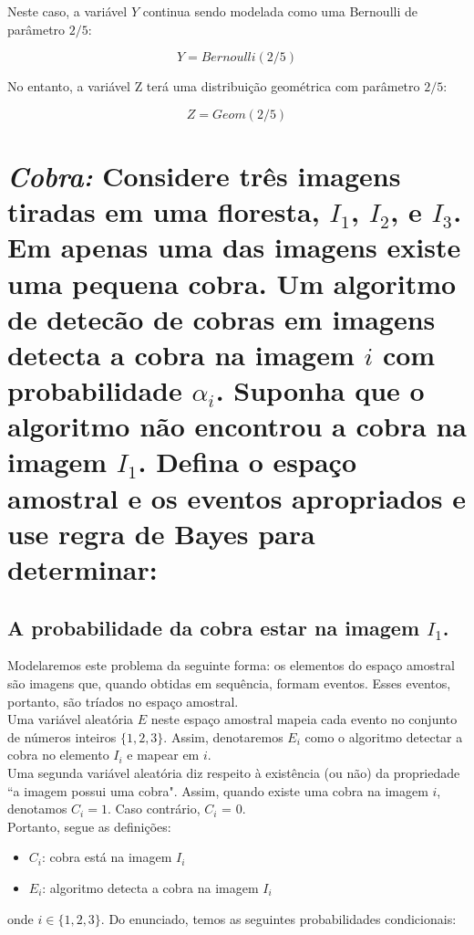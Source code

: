 \documentclass[a4paper]{article}
\begin{document}
Neste caso, a variável $Y$ continua sendo modelada como uma Bernoulli de parâmetro $2/5$:

$$Y = Bernoulli(2/5)$$

No entanto, a variável Z terá uma distribuição geométrica com parâmetro $2/5$:

$$Z = Geom(2/5)$$


\section{\textit{Cobra:} Considere três imagens tiradas em uma floresta, $I_1$, $I_2$, e $I_3$. Em apenas uma das imagens existe uma pequena cobra. Um algoritmo de detecão de cobras em imagens detecta a cobra na imagem $i$ com probabilidade $\alpha_i$. Suponha que o algoritmo não encontrou a cobra na imagem $I_1$. Defina o espaço amostral e os eventos apropriados e use regra de Bayes para determinar:}

\subsection{A probabilidade da cobra estar na imagem $I_1$.}

Modelaremos este problema da seguinte forma: os elementos do espaço amostral são imagens que, quando obtidas em sequência, formam eventos. Esses eventos, portanto, são tríados no espaço amostral. \\

Uma variável aleatória $E$ neste espaço amostral mapeia cada evento no conjunto de números inteiros $\{1, 2, 3\}$. Assim, denotaremos $E_i$ como o algoritmo detectar a cobra no elemento $I_i$ e mapear em $i$.\\

Uma segunda variável aleatória diz respeito à existência (ou não) da propriedade ``a imagem possui uma cobra".  Assim, quando existe uma cobra na imagem $i$, denotamos $C_i = 1$. Caso contrário, $C_i$ = 0. \\

Portanto, segue as definições: 

\begin{itemize}
    \item $C_i$: cobra está na imagem $I_i$
    \item $E_i$: algoritmo detecta a cobra na imagem $I_i$
\end{itemize}

onde $i \in \{1,2,3\}$. Do enunciado, temos as seguintes probabilidades condicionais:
\end{document}
